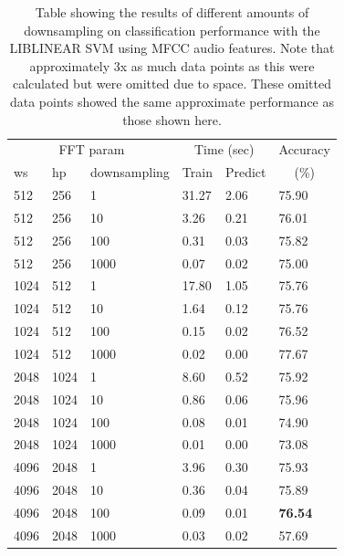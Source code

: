 \begin{table}
\begin{tabular}{|l|l|l|l|l|l|}
\hline
\multicolumn{3}{|c|}{FFT param} & \multicolumn{2}{c|}{Time (sec)} & Accuracy \\
\hhline{|-|-|-|-|-|~|}
ws & hp & downsampling & Train & Predict & \multicolumn{1}{c|}{(\%)} \\
\hhline{|=|=|=|=|=|=|}
512 & 256 & 1       &    31.27  &  2.06  &  75.90  \\
512 & 256 & 10      &     3.26  &  0.21  &  76.01  \\
512 & 256 & 100     &     0.31  &  0.03  &  75.82  \\
512 & 256 & 1000    &     0.07  &  0.02  &  75.00  \\
1024 & 512 & 1      &    17.80  &  1.05  &  75.76  \\
1024 & 512 & 10     &     1.64  &  0.12  &  75.76  \\
1024 & 512 & 100    &     0.15  &  0.02  &  76.52  \\
1024 & 512 & 1000   &     0.02  &  0.00  &  77.67  \\
\hline
2048 & 1024 & 1     &     8.60  &  0.52  &  75.92  \\
2048 & 1024 & 10    &     0.86  &  0.06  &  75.96  \\
2048 & 1024 & 100   &     0.08  &  0.01  &  74.90  \\
2048 & 1024 & 1000  &     0.01  &  0.00  &  73.08  \\
4096 & 2048 & 1     &     3.96  &  0.30  &  75.93  \\
4096 & 2048 & 10    &     0.36  &  0.04  &  75.89  \\
4096 & 2048 & 100   &     0.09  &  0.01  &  \textbf{76.54}  \\
4096 & 2048 & 1000  &     0.03  &  0.02  &  57.69  \\
\hline
\end{tabular}
\caption{Table showing the results of different amounts of
  downsampling on classification performance with the LIBLINEAR SVM
  using MFCC audio features.  Note that approximately 3x as
  much data points as this were calculated but were omitted due to
  space.  These omitted data points showed the same approximate
  performance as those shown here.}
\label{table:obv-downsampling}
\end{table}

